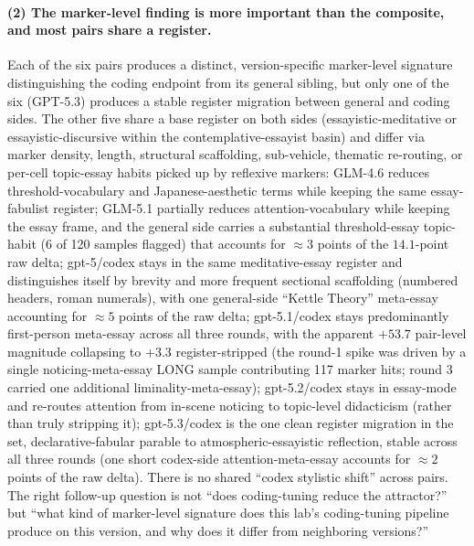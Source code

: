\documentclass[11pt,a4paper]{article}
\begin{document}
\paragraph{(2) The marker-level finding is more important than the composite, and most pairs share a register.} Each of the six pairs produces a distinct, version-specific marker-level signature distinguishing the coding endpoint from its general sibling, but only one of the six (GPT-5.3) produces a stable register migration between general and coding sides. The other five share a base register on both sides (essayistic-meditative or essayistic-discursive within the contemplative-essayist basin) and differ via marker density, length, structural scaffolding, sub-vehicle, thematic re-routing, or per-cell topic-essay habits picked up by reflexive markers: GLM-4.6 reduces threshold-vocabulary and Japanese-aesthetic terms while keeping the same essay-fabulist register; GLM-5.1 partially reduces attention-vocabulary while keeping the essay frame, and the general side carries a substantial threshold-essay topic-habit (6 of 120 samples flagged) that accounts for $\approx 3$ points of the $14.1$-point raw delta; gpt-5/codex stays in the same meditative-essay register and distinguishes itself by brevity and more frequent sectional scaffolding (numbered headers, roman numerals), with one general-side ``Kettle Theory'' meta-essay accounting for $\approx 5$ points of the raw delta; gpt-5.1/codex stays predominantly first-person meta-essay across all three rounds, with the apparent $+53.7$ pair-level magnitude collapsing to $+3.3$ register-stripped (the round-1 spike was driven by a single noticing-meta-essay LONG sample contributing 117 marker hits; round 3 carried one additional liminality-meta-essay); gpt-5.2/codex stays in essay-mode and re-routes attention from in-scene noticing to topic-level didacticism (rather than truly stripping it); gpt-5.3/codex is the one clean register migration in the set, declarative-fabular parable to atmospheric-essayistic reflection, stable across all three rounds (one short codex-side attention-meta-essay accounts for $\approx 2$ points of the raw delta). There is no shared ``codex stylistic shift'' across pairs. The right follow-up question is not ``does coding-tuning reduce the attractor?'' but ``what kind of marker-level signature does this lab's coding-tuning pipeline produce on this version, and why does it differ from neighboring versions?''
\end{document}
